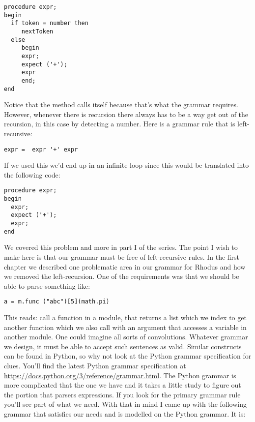 \begin{lstlisting}
procedure expr;
begin
  if token = number then
     nextToken
  else
     begin
     expr;
     expect ('+');
     expr
     end;
end
\end{lstlisting}

Notice that the method calls itself because that's what the grammar requires. However, whenever there is recursion there always has to be a way get out of the recursion, in this case by detecting a number. Here is a grammar rule that is left-recursive:

\begin{lstlisting}
expr =  expr '+' expr
\end{lstlisting}

If we used this we'd end up in an infinite loop since this would be translated into the following code:

\begin{lstlisting}
procedure expr;
begin
  expr;
  expect ('+');
  expr;
end
\end{lstlisting}

We covered this problem and more in part I of the series. The point I wish to make here is that our grammar must be free of left-recursive rules. In the first chapter we described one problematic area in our grammar for Rhodus and how we removed the left-recursion. One of the requirements was that we should be able to parse something like:

\begin{lstlisting}
a = m.func ("abc")[5](math.pi)
\end{lstlisting}

This reads: call a function in a module, that returns a list which we index to get another function which we also call with an argument that accesses a variable in another module. One could imagine all sorts of convolutions. Whatever grammar we design, it must be able to accept such sentences as valid. Similar constructs can be found in Python, so why not look at the Python grammar specification for clues.  You'll find the latest Python grammar specification at \url{https://docs.python.org/3/reference/grammar.html}. The Python grammar is more complicated that the one we have and it takes a little study to figure out the portion that parsers expressions. If you look for the primary grammar rule you'll see part of what we need. With that in mind I came up with the following grammar that satisfies our needs and is modelled on the Python grammar. It is:

